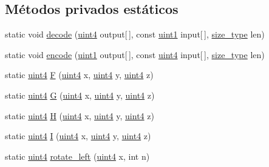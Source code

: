 \subsection*{Métodos privados estáticos}
\begin{DoxyCompactItemize}
\item 
static void \hyperlink{classMD5_a7eef3463c43a2cdfb56a0261b640f873}{decode} (\hyperlink{classMD5_a2e5b84a3d7db292f49873061214a0444}{uint4} output\mbox{[}$\,$\mbox{]}, const \hyperlink{classMD5_a3b1c4901139aef256ee49c4ab14d09f9}{uint1} input\mbox{[}$\,$\mbox{]}, \hyperlink{classMD5_aa836972700679dbcff6ae8337f6db464}{size\+\_\+type} len)
\item 
static void \hyperlink{classMD5_a52603a1b589b2863cad4caae7f259b7e}{encode} (\hyperlink{classMD5_a3b1c4901139aef256ee49c4ab14d09f9}{uint1} output\mbox{[}$\,$\mbox{]}, const \hyperlink{classMD5_a2e5b84a3d7db292f49873061214a0444}{uint4} input\mbox{[}$\,$\mbox{]}, \hyperlink{classMD5_aa836972700679dbcff6ae8337f6db464}{size\+\_\+type} len)
\item 
static \hyperlink{classMD5_a2e5b84a3d7db292f49873061214a0444}{uint4} \hyperlink{classMD5_a95b7adf4602b92e84ca5f34084859e79}{F} (\hyperlink{classMD5_a2e5b84a3d7db292f49873061214a0444}{uint4} x, \hyperlink{classMD5_a2e5b84a3d7db292f49873061214a0444}{uint4} y, \hyperlink{classMD5_a2e5b84a3d7db292f49873061214a0444}{uint4} z)
\item 
static \hyperlink{classMD5_a2e5b84a3d7db292f49873061214a0444}{uint4} \hyperlink{classMD5_afbc3ab3591fca4e780f647dac3952bc8}{G} (\hyperlink{classMD5_a2e5b84a3d7db292f49873061214a0444}{uint4} x, \hyperlink{classMD5_a2e5b84a3d7db292f49873061214a0444}{uint4} y, \hyperlink{classMD5_a2e5b84a3d7db292f49873061214a0444}{uint4} z)
\item 
static \hyperlink{classMD5_a2e5b84a3d7db292f49873061214a0444}{uint4} \hyperlink{classMD5_a59392e8552045b37628a48497ede9cf0}{H} (\hyperlink{classMD5_a2e5b84a3d7db292f49873061214a0444}{uint4} x, \hyperlink{classMD5_a2e5b84a3d7db292f49873061214a0444}{uint4} y, \hyperlink{classMD5_a2e5b84a3d7db292f49873061214a0444}{uint4} z)
\item 
static \hyperlink{classMD5_a2e5b84a3d7db292f49873061214a0444}{uint4} \hyperlink{classMD5_ad2c1682834e38219894728830e3996c3}{I} (\hyperlink{classMD5_a2e5b84a3d7db292f49873061214a0444}{uint4} x, \hyperlink{classMD5_a2e5b84a3d7db292f49873061214a0444}{uint4} y, \hyperlink{classMD5_a2e5b84a3d7db292f49873061214a0444}{uint4} z)
\item 
static \hyperlink{classMD5_a2e5b84a3d7db292f49873061214a0444}{uint4} \hyperlink{classMD5_a97ece3d8221e3c9c994aa9d13001b1d9}{rotate\+\_\+left} (\hyperlink{classMD5_a2e5b84a3d7db292f49873061214a0444}{uint4} x, int n)

\end{DoxyCompactItemize}
